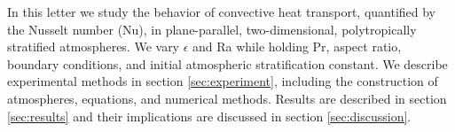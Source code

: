 \documentclass[aps, prl, twocolumn, nofootinbib, groupedaddress, amsfonts, amssymb, amsmath]{revtex4-1}
\newcommand{\nrho}{\ensuremath{n_{\rho}}}
\begin{document}

In this letter we study the behavior of convective heat transport, 
quantified by the Nusselt number (Nu), in plane-parallel, 
two-dimensional, polytropically stratified atmospheres.  
We vary $\epsilon$ and Ra while holding Pr, aspect ratio, boundary conditions,
and initial atmospheric stratification
constant.  We describe experimental methods in section 
\ref{sec:experiment}, including the construction of atmospheres, equations, and numerical methods.  
Results are described in section \ref{sec:results} and their implications are discussed
in section \ref{sec:discussion}.
\end{document}
